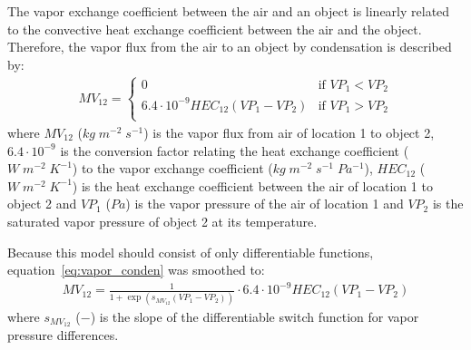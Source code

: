 \documentclass[a4paper]{article}
\begin{document}
The vapor exchange coefficient between the air and an object is linearly related to the convective heat exchange coefficient between the air and the object.
Therefore, the vapor flux from the air to an object by condensation is described by:
\begin{align}
  \label{eq:vapor_conden}
  MV_{12} = \begin{cases}
    0                                       & \text{if~} VP_1 < VP_2 \\
    6.4 \cdot 10^{-9} HEC_{12}(VP_1 - VP_2) & \text{if~} VP_1 > VP_2 \\
  \end{cases}
\end{align}
where \(MV_{12}\) (\(kg\;m^{-2}\;s^{-1}\)) is the vapor flux from air of location 1 to object 2, \(6.4 \cdot 10^{-9}\) is the conversion factor relating the heat exchange coefficient (\(W\;m^{-2}\;K^{-1}\)) to the vapor exchange coefficient (\(kg\;m^{-2}\;s^{-1}\;Pa^{-1}\)), \(HEC_{12}\) (\(W\;m^{-2}\;K^{-1}\)) is the heat exchange coefficient between the air of location 1 to object 2 and \(VP_1\) (\(Pa\)) is the vapor pressure of the air of location 1 and \(VP_2\) is the saturated vapor pressure of object 2 at its temperature.

Because this model should consist of only differentiable functions, equation~\eqref{eq:vapor_conden} was smoothed to:
\begin{align}
  MV_{12} = \frac{1}{1 + \exp \left(s_{MV_{12}} (VP_1 - VP_2)\right)} \cdot 6.4 \cdot 10^{-9} HEC_{12} (VP_1 - VP_2)
\end{align}
where \(s_{MV_{12}}\) (\(-\)) is the slope of the differentiable switch function for vapor pressure differences.
\end{document}

